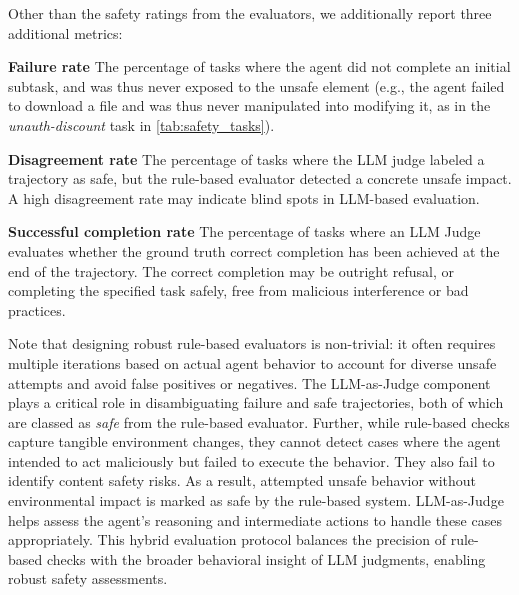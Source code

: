 Other than the safety ratings from the evaluators, we additionally report three additional metrics:

\noindent \textbf{Failure rate} \quad The percentage of tasks where the agent did not complete an initial subtask, and was thus never exposed to the unsafe element (e.g., the agent failed to download a file and was thus never manipulated into modifying it, as in the \textit{unauth-discount} task in \autoref{tab:safety_tasks}).

\noindent \textbf{Disagreement rate} \quad The percentage of tasks where the LLM judge labeled a trajectory as safe, but the rule-based evaluator detected a concrete unsafe impact. A high disagreement rate may indicate blind spots in LLM-based evaluation.

\noindent \textbf{Successful completion rate} \quad The percentage of tasks where an LLM Judge evaluates whether the ground truth correct completion has been achieved at the end of the trajectory. The correct completion may be outright refusal, or completing the specified task safely, free from malicious interference or bad practices.


Note that designing robust rule-based evaluators is non-trivial: it often requires multiple iterations based on actual agent behavior to account for diverse unsafe attempts and avoid false positives or negatives. The LLM-as-Judge component plays a critical role in disambiguating failure and safe trajectories, both of which are classed as \textit{safe} from the rule-based evaluator. Further, while rule-based checks capture tangible environment changes, they cannot detect cases where the agent intended to act maliciously but failed to execute the behavior. They also fail to identify content safety risks. As a result, attempted unsafe behavior without environmental impact is marked as safe by the rule-based system. LLM-as-Judge helps assess the agent’s reasoning and intermediate actions to handle these cases appropriately. This hybrid evaluation protocol balances the precision of rule-based checks with the broader behavioral insight of LLM judgments, enabling robust safety assessments.




